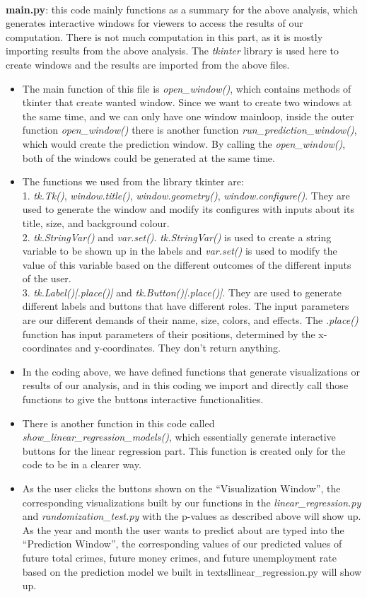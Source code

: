 \documentclass[fontsize=11pt]{article}
\begin{document}
\\
\textbf{main.py}: this code mainly functions as a summary for the above analysis, which generates interactive windows for viewers to access the results of our computation. There is not much computation in this part, as it is mostly importing results from the above analysis. The \textsl{tkinter} library is used here to create windows and the results are imported from the above files.
\begin{itemize}
    \item The main function of this file is \textit{open\_window()}, which contains methods of tkinter that create wanted window. Since we want to create two windows at the same time, and we can only have one window mainloop, inside the outer function \textit{open\_window()} there is another function \textit{run\_prediction\_window()}, which would create the prediction window. By calling the \textit{open\_window()}, both of the windows could be generated at the same time.
    \item The functions we used from the library tkinter are:\\
    1. \textit{tk.Tk()}, \textit{window.title()}, \textit{window.geometry()}, \textit{window.configure()}. They are used to generate the window and modify its configures with inputs about its title, size, and background colour.\\
    2. \textit{tk.StringVar()} and \textit{var.set()}. \textit{tk.StringVar()} is used to create a string variable to be shown up in the labels and \textit{var.set()} is used to modify the value of this variable based on the different outcomes of the different inputs of the user.\\
    3. \textit{tk.Label()[.place()]} and \textit{tk.Button()[.place()]}. They are used to generate different labels and buttons that have different roles. The input parameters are our different demands of their name, size, colors, and effects. The \textit{.place()} function has input parameters of their positions, determined by the x-coordinates and y-coordinates. They don't return anything.
    \item In the coding above, we have defined functions that generate visualizations or results of our analysis, and in this coding we import and directly call those functions to give the buttons interactive functionalities.
    \item There is another function in this code called \textit{show\_linear\_regression\_models()}, which essentially generate interactive buttons for the linear regression part. This function is created only for the code to be in a clearer way.
    \item As the user clicks the buttons shown on the “Visualization Window”, the corresponding visualizations built by our functions in the \textsl{linear\_regression.py} and \textsl{randomization\_test.py} with the p-values as described above will show up. As the year and month the user wants to predict about are typed into the “Prediction Window”, the corresponding values of our predicted values of future total crimes, future money crimes, and future unemployment rate based on the prediction model we built in textsl{linear\_regression.py} will show up.
\end{itemize}
\end{document}
